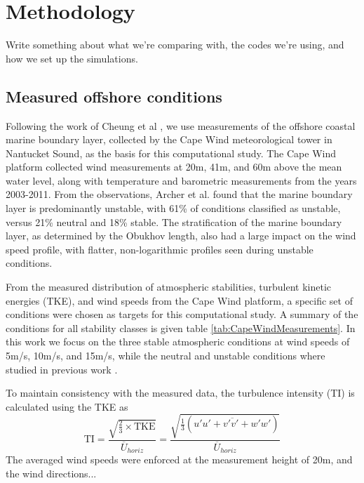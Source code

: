 \section{Methodology}
Write something about what we're comparing with, the codes we're
using, and how we set up the simulations.

\subsection{Measured offshore conditions}

Following the work of Cheung et al \cite{cheung2020large}, we use
measurements of the offshore coastal marine boundary layer, collected
by the Cape Wind meteorological tower in Nantucket Sound, as the basis
for this computational study.  The Cape Wind platform collected wind
measurements at 20m, 41m, and 60m above the mean water level, along
with temperature and barometric measurements from the years 2003-2011.
From the observations, Archer et al.\cite{archer2016predominance}
found that the marine boundary layer is predominantly unstable, with
61\% of conditions classified as unstable, versus 21\% neutral and
18\% stable.  The stratification of the marine boundary layer, as
determined by the Obukhov length, also had a large impact on the wind
speed profile, with flatter, non-logarithmic profiles seen during
unstable conditions.

From the measured distribution of atmospheric stabilities, turbulent
kinetic energies (TKE), and wind speeds from the Cape Wind platform, a
specific set of conditions were chosen as targets for this
computational study.  A summary of the conditions for all stability
classes is given table \ref{tab:CapeWindMeasurements}. In this work we
focus on the three stable atmospheric conditions at wind speeds of
5m/s, 10m/s, and 15m/s, while the neutral and unstable conditions
where studied in previous work \cite{cheung2020large}.

To maintain consistency with the measured data, the turbulence
intensity (TI) is calculated using the TKE as
\begin{equation}
  \textrm{TI} =
  \frac{\sqrt{\frac{2}{3}\times\textrm{TKE}}}{\overline{U}_{horiz}} =
  \frac{\sqrt{\frac{1}{3}\left( \overline{u'u' + v'v' + w'w'}
      \right)}}{\overline{U}_{horiz}}
\end{equation}
The averaged wind speeds were enforced at the measurement height of
20m, and the wind directions...

